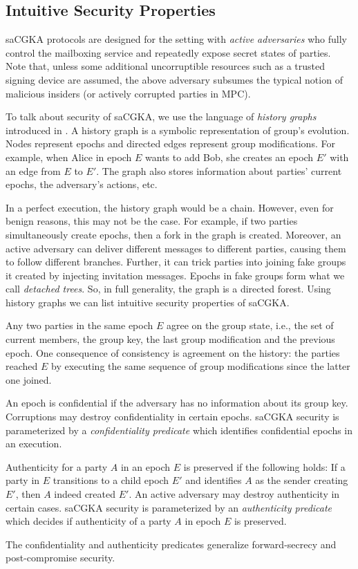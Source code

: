 \subsection{Intuitive Security Properties}
saCGKA protocols are designed for the setting with \emph{active adversaries} who fully control the mailboxing service and repeatedly expose secret states of parties. Note that, unless some additional uncorruptible resources such as a trusted signing device are assumed, the above adversary subsumes the typical notion of malicious insiders (or actively corrupted parties in MPC).

To talk about security of saCGKA, we use the language of \emph{history
graphs} introduced in \cite{CCS:ACDT21}. A history graph is a symbolic
representation of group's evolution. Nodes represent epochs and
directed edges represent group modifications. For example, when
Alice in epoch $E$ wants to add Bob, she creates an epoch $E'$ with an edge
from $E$ to $E'$. The graph also stores information about parties' current
epochs, the adversary's actions, etc.

In a perfect execution, the history graph would be a chain. However, even for
benign reasons, this may not be the case. For example, if two parties
simultaneously create epochs, then a fork in the graph is created. Moreover,
an active adversary can deliver different messages to different parties,
causing them to follow different branches. Further, it can trick parties into
joining fake groups it created by injecting invitation messages. Epochs in
fake groups form what we call \emph{detached trees}. So, in full generality,
the graph is a directed forest.
%
Using history graphs we can list intuitive security properties of saCGKA.
\begin{description}[itemsep=2pt,topsep=2pt,parsep=2pt]
  \item[Consistency] Any two parties in the same epoch $E$ agree on the group state, i.e., the set of current members, the group key, the last group modification and the previous epoch. One consequence of consistency is agreement on the history: the parties reached $E$ by executing the same sequence of group modifications since the latter one joined.
  \item[Confidentiality] An epoch is confidential if the adversary has no information about its group key. Corruptions may destroy confidentiality in certain epochs. saCGKA security is parameterized by a \emph{confidentiality predicate} which identifies confidential epochs in an execution.
  \item[Authenticity] Authenticity for a party $A$ in an epoch $E$ is preserved if the following holds: If a party in $E$ transitions to a child epoch $E'$ and identifies $A$ as the sender creating $E'$, then $A$ indeed created $E'$. An active adversary may destroy authenticity in certain cases. saCGKA security is parameterized by an \emph{authenticity predicate} which decides if authenticity of a party $A$ in epoch $E$ is preserved.
\end{description}
The confidentiality and authenticity predicates generalize forward-secrecy and post-compromise security.

